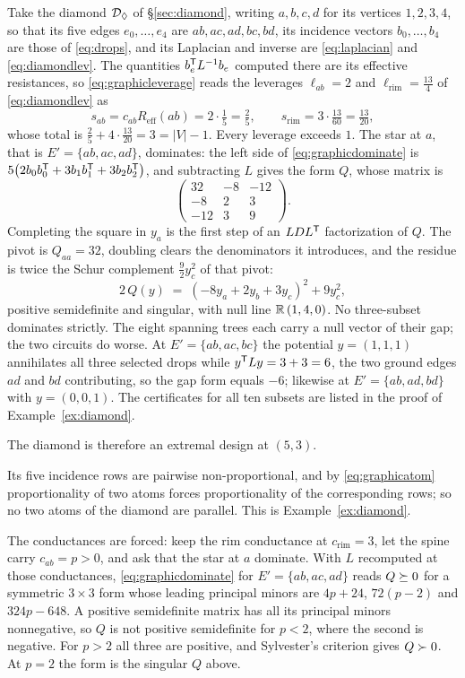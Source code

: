 Take the diamond $\mathcal{D}_{\Diamond}$ of \S\ref{sec:diamond}, writing
$a,b,c,d$ for its vertices $1,2,3,4$, so that its five edges
$e_0,\dots,e_4$ are $ab,ac,ad,bc,bd$, its incidence vectors
$b_0,\dots,b_4$ are those of \eqref{eq:drops}, and its Laplacian and
inverse are \eqref{eq:laplacian} and \eqref{eq:diamondlev}.  The
quantities $b_e^{\mathsf{T}} L^{-1}b_e$ computed there are its effective
resistances, so \eqref{eq:graphicleverage} reads the leverages
$\ell_{ab}=2$ and $\ell_{\mathrm{rim}}=\tfrac{13}4$ of
\eqref{eq:diamondlev} as
\[
  s_{ab}=c_{ab}R_{\mathrm{eff}}(ab)=2\cdot\tfrac15=\tfrac25,
  \qquad
  s_{\mathrm{rim}}=3\cdot\tfrac{13}{60}=\tfrac{13}{20},
\]
whose total is $\tfrac25+4\cdot\tfrac{13}{20}=3=\lvert V\rvert-1$.  Every
leverage exceeds $1$.  The star at $a$, that is $E'=\{ab,ac,ad\}$,
dominates: the left side of \eqref{eq:graphicdominate} is
$5\bigl(2b_0b_0^{\mathsf{T}}+3b_1b_1^{\mathsf{T}}+3b_2b_2^{\mathsf{T}}\bigr)$, and subtracting $L$ gives
the form $Q$, whose matrix is
\[
  \begin{pmatrix}32&-8&-12\\ -8&2&3\\ -12&3&9\end{pmatrix} .
\]
Completing the square in $y_a$ is the first step of an $LDL^{\mathsf{T}}$
factorization of $Q$.  The pivot is $Q_{aa}=32$, doubling clears the
denominators it introduces, and the residue is twice the Schur complement
$\tfrac92y_c^2$ of that pivot:
\[
  2\,Q(y)\;=\;(-8y_a+2y_b+3y_c)^2+9y_c^2 ,
\]
positive semidefinite and singular, with null line $\mathbb{R}\,(1,4,0)$.  No
three-subset dominates strictly.  The eight spanning trees each carry a null
vector of their gap; the two circuits do worse.  At $E'=\{ab,ac,bc\}$ the
potential $y=(1,1,1)$ annihilates all three selected drops while
$y^{\mathsf{T}} Ly=3+3=6$, the two ground edges $ad$ and $bd$ contributing, so the gap
form equals $-6$; likewise at $E'=\{ab,ad,bd\}$ with $y=(0,0,1)$.  The
certificates for all ten subsets are listed in the proof of
Example~\ref{ex:diamond}.

The diamond is therefore an extremal design at $(5,3)$.

Its five incidence rows are pairwise non-proportional, and by
\eqref{eq:graphicatom} proportionality of two atoms forces proportionality
of the corresponding rows; so no two atoms of the diamond are parallel.
This is Example~\ref{ex:diamond}.

The conductances are forced: keep the rim conductance at
$c_{\mathrm{rim}}=3$, let the spine carry $c_{ab}=p>0$, and ask that the star
at $a$ dominate.  With $L$ recomputed at those conductances,
\eqref{eq:graphicdominate} for $E'=\{ab,ac,ad\}$ reads $Q\succeq0$ for a
symmetric $3\times3$ form whose leading principal minors are $4p+24$,
$72(p-2)$ and $324p-648$.  A positive semidefinite matrix has all its
principal minors nonnegative, so $Q$ is not positive semidefinite for
$p<2$, where the second is negative.  For $p>2$ all three are positive, and
Sylvester's criterion gives $Q\succ0$.  At $p=2$ the form is the singular $Q$
above.

